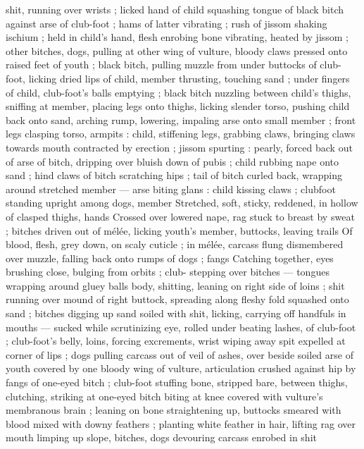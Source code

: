 {shit, running over wrists ; licked hand of child squashing tongue of 
black bitch against arse of club-foot ; hams of latter vibrating ; rush 
of jissom shaking ischium ; held in child's hand, flesh enrobing bone 
vibrating, heated by jissom ; other bitches, dogs, pulling at other 
wing of vulture, bloody claws pressed onto raised feet of youth ; 
black bitch, pulling muzzle from under buttocks of club-foot, licking 
dried lips of child, member thrusting, touching sand ; under fingers 
of child, club-foot's balls emptying ; black bitch nuzzling between 
child's thighs, sniffing at member, placing legs onto thighs, licking 
slender torso, pushing child back onto sand, arching rump, lowering, 
impaling arse onto small member ; front legs clasping torso, armpits 
: child, stiffening legs, grabbing claws, bringing claws towards mouth 
contracted by erection ; jissom spurting : pearly, forced back out of 
arse of bitch, dripping over bluish down of pubis ; child rubbing 
nape onto sand ; hind claws of bitch scratching hips ; tail of bitch 
curled back, wrapping around stretched member --- arse biting glans 
: child kissing claws ; clubfoot standing upright among dogs, member 
Stretched, soft, sticky, reddened, in hollow of clasped thighs, hands 
Crossed over lowered nape, rag stuck to breast by sweat ; bitches 
driven out of mélée, licking youth's member, buttocks, leaving trails 
Of blood, flesh, grey down, on scaly cuticle ; in mélée, carcass flung 
dismembered over muzzle, falling back onto rumps of dogs ; fangs 
Catching together, eyes brushing close, bulging from orbits ; club- 
stepping over bitches --- tongues wrapping around gluey balls 
body, shitting, leaning on right side of loins ; shit running over 
mound of right buttock, spreading along fleshy fold squashed onto 
sand ; bitches digging up sand soiled with shit, licking, carrying off 
handfuls in mouths --- sucked while scrutinizing eye, rolled under 
beating lashes, of club-foot ; club-foot's belly, loins, forcing 
excrements, wrist wiping away spit expelled at corner of lips ; dogs 
pulling carcass out of veil of ashes, over beside soiled arse of youth 
covered by one bloody wing of vulture, articulation crushed against 
hip by fangs of one-eyed bitch ; club-foot stuffing bone, stripped 
bare, between thighs, clutching, striking at one-eyed bitch biting at 
knee covered with vulture's membranous brain ; leaning on bone 
straightening up, buttocks smeared with blood mixed with downy 
feathers ; planting white feather in hair, lifting rag over mouth 
limping up slope, bitches, dogs devouring carcass enrobed in shit 
}
